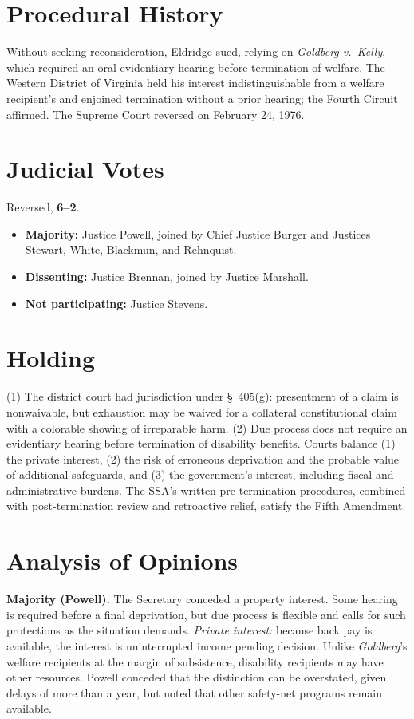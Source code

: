 \documentclass[12pt]{article}
\begin{document}
\section{Procedural History}

Without seeking reconsideration, Eldridge sued, relying on \textit{Goldberg v.\ Kelly}, which required an oral evidentiary hearing before termination of welfare. The Western District of Virginia held his interest indistinguishable from a welfare recipient's and enjoined termination without a prior hearing; the Fourth Circuit affirmed. The Supreme Court reversed on February 24, 1976.

\section{Judicial Votes}

Reversed, \textbf{6--2}.
\begin{itemize}
\item \textbf{Majority:} Justice Powell, joined by Chief Justice Burger and Justices Stewart, White, Blackmun, and Rehnquist.
\item \textbf{Dissenting:} Justice Brennan, joined by Justice Marshall.
\item \textbf{Not participating:} Justice Stevens.
\end{itemize}

\section{Holding}

(1) The district court had jurisdiction under \S~405(g): presentment of a claim is nonwaivable, but exhaustion may be waived for a collateral constitutional claim with a colorable showing of irreparable harm. (2) Due process does not require an evidentiary hearing before termination of disability benefits. Courts balance (1) the private interest, (2) the risk of erroneous deprivation and the probable value of additional safeguards, and (3) the government's interest, including fiscal and administrative burdens. The SSA's written pre-termination procedures, combined with post-termination review and retroactive relief, satisfy the Fifth Amendment.

\section{Analysis of Opinions}

\textbf{Majority (Powell).} The Secretary conceded a property interest. Some hearing is required before a final deprivation, but due process is flexible and calls for such protections as the situation demands. \emph{Private interest:} because back pay is available, the interest is uninterrupted income pending decision. Unlike \textit{Goldberg}'s welfare recipients at the margin of subsistence, disability recipients may have other resources. Powell conceded that the distinction can be overstated, given delays of more than a year, but noted that other safety-net programs remain available.
\end{document}
